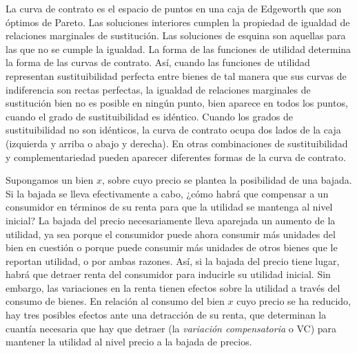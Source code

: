 \documentclass{nuevotema}
\begin{document}

La curva de contrato es el espacio de puntos en una caja de Edgeworth que son óptimos de Pareto. Las soluciones interiores cumplen la propiedad de igualdad de relaciones marginales de sustitución. Las soluciones de esquina son aquellas para las que no se cumple la igualdad. La forma de las funciones de utilidad determina la forma de las curvas de contrato. Así, cuando las funciones de utilidad representan sustituibilidad perfecta entre bienes de tal manera que sus curvas de indiferencia son rectas perfectas, la igualdad de relaciones marginales de sustitución bien no es posible en ningún punto, bien aparece en todos los puntos, cuando el grado de sustituibilidad es idéntico. Cuando los grados de sustituibilidad no son idénticos, la curva de contrato ocupa dos lados de la caja (izquierda y arriba o abajo y derecha). En otras combinaciones de sustituibilidad y complementariedad pueden aparecer diferentes formas de la curva de contrato.


Supongamos un bien $x$, sobre cuyo precio se plantea la posibilidad de una bajada. Si la bajada se lleva efectivamente a cabo, ¿cómo habrá que compensar a un consumidor en términos de su renta para que la utilidad se mantenga al nivel inicial? La bajada del precio necesariamente lleva aparejada un aumento de la utilidad, ya sea porque el consumidor puede ahora consumir más unidades del bien en cuestión o porque puede consumir más unidades de otros bienes que le reportan utilidad, o por ambas razones. Así, si la bajada del precio tiene lugar, habrá que detraer renta del consumidor para inducirle su utilidad inicial. Sin embargo, las variaciones en la renta tienen efectos sobre la utilidad a través del consumo de bienes. En relación al consumo del bien $x$ cuyo precio se ha reducido, hay tres posibles efectos ante una detracción de su renta, que determinan la cuantía necesaria que hay que detraer (la \textit{variación compensatoria} o VC) para mantener la utilidad al nivel precio a la bajada de precios.
\end{document}
